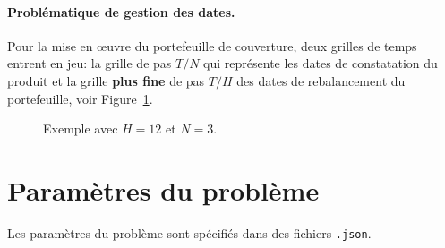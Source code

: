 \documentclass[a4paper,11pt]{article}
\begin{document}
\paragraph{Problématique de gestion des dates.} Pour la mise en {\oe}uvre du portefeuille de couverture, deux grilles de temps entrent en jeu: la grille de pas $T/N$ qui représente les dates de constatation du produit et la grille \textbf{plus fine} de pas $T/H$ des dates de rebalancement du portefeuille, voir Figure~\ref{fig:grid}.
\vspace{1em}

\begin{figure}[h!t]
\caption{Exemple avec $H=12$ et $N=3$. \label{fig:grid}}
\end{figure}

\section{Paramètres du problème}
\label{sec:parser}

Les paramètres du problème sont spécifiés dans des fichiers \texttt{.json}. 
\end{document}
